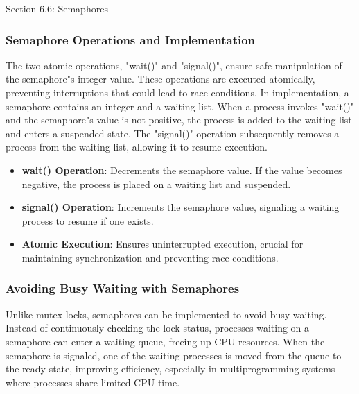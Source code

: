 \begin{notes}{Section 6.6: Semaphores}
\begin{highlight}
    \end{highlight}
    
    \subsubsection*{Semaphore Operations and Implementation}
    
    The two atomic operations, "wait()" and "signal()", ensure safe manipulation of the semaphore"s integer value. These operations are executed atomically, preventing interruptions that could lead to 
    race conditions. In implementation, a semaphore contains an integer and a waiting list. When a process invokes "wait()" and the semaphore"s value is not positive, the process is added to the waiting 
    list and enters a suspended state. The "signal()" operation subsequently removes a process from the waiting list, allowing it to resume execution.
    
    \begin{highlight}
    
        \begin{itemize}
            \item \textbf{wait() Operation}: Decrements the semaphore value. If the value becomes negative, the process is placed on a waiting list and suspended.
            \item \textbf{signal() Operation}: Increments the semaphore value, signaling a waiting process to resume if one exists.
            \item \textbf{Atomic Execution}: Ensures uninterrupted execution, crucial for maintaining synchronization and preventing race conditions.
        \end{itemize}
    
    \end{highlight}
    
    \subsubsection*{Avoiding Busy Waiting with Semaphores}
    
    Unlike mutex locks, semaphores can be implemented to avoid busy waiting. Instead of continuously checking the lock status, processes waiting on a semaphore can enter a waiting queue, freeing up 
    CPU resources. When the semaphore is signaled, one of the waiting processes is moved from the queue to the ready state, improving efficiency, especially in multiprogramming systems where processes 
    share limited CPU time.
    

\end{notes}
